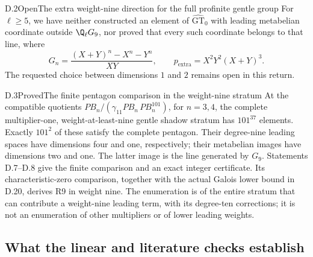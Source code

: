 \begin{statement}{D.2}{Open}{The extra weight-nine direction for the full profinite gentle group}
For $\ell\geq5$, we have neither constructed an element of
$\widehat{\mathrm{GT}}_0$ with leading metabelian coordinate outside
$\Q_\ell G_9$, nor proved that every such coordinate belongs to that line,
where
\[
 G_n=\frac{(X+Y)^n-X^n-Y^n}{XY},\qquad
 p_{\mathrm{extra}}=X^2Y^2(X+Y)^3.
\]
The requested choice between dimensions $1$ and $2$ remains open in
this return.
\end{statement}

\begin{statement}{D.3}{Proved}{The finite pentagon comparison in the weight-nine stratum}
At the compatible quotients
$PB_n/(\gamma_{11}PB_n\,PB_n^{101})$, for $n=3,4$, the complete
multiplier-one, weight-at-least-nine gentle shadow stratum has
$101^{37}$ elements. Exactly $101^2$ of these satisfy the complete
pentagon. Their degree-nine leading spaces have dimensions four and
one, respectively; their metabelian images have dimensions two and
one. The latter image is the line generated by $G_9$.
Statements D.7--D.8 give the finite comparison and an exact integer
certificate. Its characteristic-zero comparison, together with the
actual Galois lower bound in D.20, derives R9 in weight nine.
The enumeration is of the entire stratum that can contribute a
weight-nine leading term, with its degree-ten corrections; it is
not an enumeration of other multipliers or of lower leading weights.
\end{statement}

\subsection{What the linear and literature checks establish}

